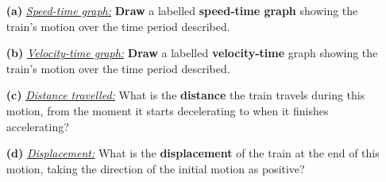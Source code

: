 \documentclass[A4,12pt]{article}
\begin{document}
\begin{enumerate}[label=\bfseries (\arabic*)]
%
\begin{itemize}
    \item[\bf (a)] \href{https://isaacphysics.org/questions/vector_scalar_train?board=aa9cd909-45d0-45da-921f-d2435c9b3afc}{\it Speed-time graph:} \textbf{Draw} a labelled \textbf{speed-time graph} showing the train's motion over the time period described.
    \item[\bf (b)] \href{https://isaacphysics.org/questions/vector_scalar_train?board=aa9cd909-45d0-45da-921f-d2435c9b3afc}{\it Velocity-time graph:} \textbf{Draw} a labelled \textbf{velocity-time} graph showing the train's motion over the time period described.
    \item[\bf (c)] \href{https://isaacphysics.org/questions/vector_scalar_train?board=aa9cd909-45d0-45da-921f-d2435c9b3afc}{\it Distance travelled:}
    What is the \textbf{distance} the train travels during this motion, from the moment it starts decelerating to when it finishes accelerating?
    \item[\bf (d)] \href{https://isaacphysics.org/questions/vector_scalar_train?board=aa9cd909-45d0-45da-921f-d2435c9b3afc}{\it Displacement:}
    What is the \textbf{displacement} of the train at the end of this motion, taking the direction of the initial motion as positive?
\end{itemize}
%
%
%
%
%
%
%
%
%
%
%
%
%
%
%
%

\end{enumerate}
\end{document}

